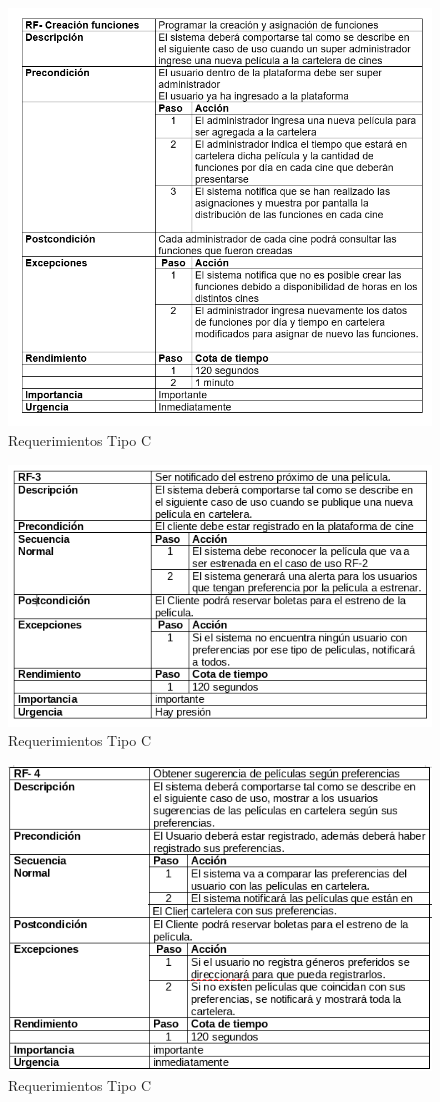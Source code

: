 \begin{figure}[h!]
\centering
\includegraphics[width=.8\linewidth]{diseno/requerimientos/imgs/casos2}
	\caption{Requerimientos Tipo C}
\end{figure}
\newpage
\begin{figure}[h!]
\centering
\includegraphics[width=.8\linewidth]{diseno/requerimientos/imgs/casos3}
	\caption{Requerimientos Tipo C}
\end{figure}
\newpage
\begin{figure}[h!]
\centering
\includegraphics[width=.8\linewidth]{diseno/requerimientos/imgs/casos4}
	\caption{Requerimientos Tipo C}
\end{figure}
